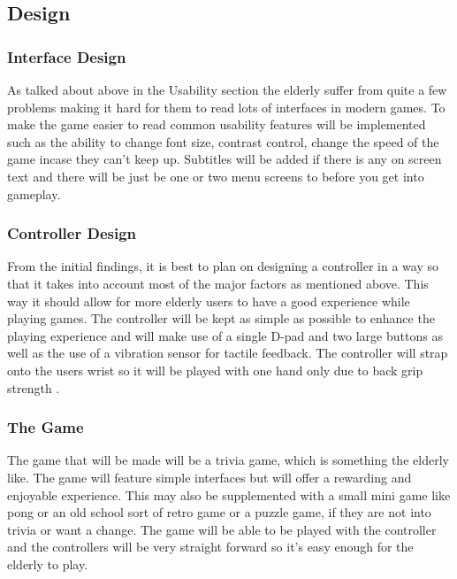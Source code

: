 \documentclass[journal]{IEEEtran}
\begin{document}
\subsection{Design}
\subsubsection{Interface Design}
As talked about above in the Usability section the elderly suffer from quite a few problems making it hard for them to read lots of interfaces in modern games. To make the game easier to read common usability features will be implemented such as the ability to change font size, contrast control, change the speed of the game incase they can't keep up. Subtitles will be added if there is any on screen text and there will be just be one or two menu screens to before you get into gameplay. 


\subsubsection{Controller Design}
From the initial findings, it is best to plan on designing a controller in a way so that it takes into account most of the major factors as mentioned above. This way it should allow for more elderly users to have a good experience while playing games. The controller will be kept as simple as possible to enhance the playing experience and will make use of a single D-pad and two large buttons as well as the use of a vibration sensor for tactile feedback. The controller will strap onto the users wrist so it will be played with one hand only due to back grip strength \cite{ijsselsteijn_digital_2007}.

\subsubsection{The Game}
The game that will be made will be a trivia game, which is something the elderly like. The game will feature simple interfaces but will offer a rewarding and enjoyable experience. This may also be supplemented with a small mini game like pong or an old school sort of retro game or a puzzle game, if they are not into trivia or want a change. The game will be able to be played with the controller and the controllers will be very straight forward so it's easy enough for the elderly to play.
\end{document}

